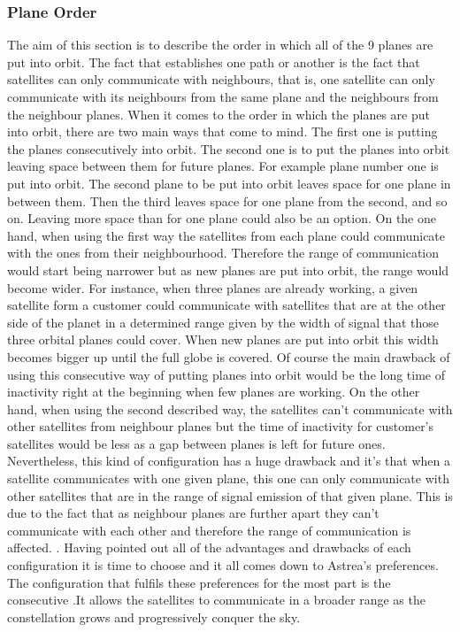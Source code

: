 \subsubsection{Plane Order}
The aim of this section is to describe the order in which all of the 9 planes are put into orbit. The fact that establishes one path or another is the fact that satellites can only communicate with neighbours, that is, one satellite can only communicate with its neighbours from the same plane and the neighbours from the neighbour planes.
\newline\newline
When it comes to the order in which the planes are put into orbit, there are two main ways that come to mind. The first one is putting the planes consecutively into orbit. The second one is to put the planes into orbit leaving space between them for future planes. For example plane number one is put into orbit. The second plane to be put into orbit leaves space for one plane in between them. Then the third leaves space for one plane from the second, and so on. Leaving more space than for one plane could also be an option.
\newline\newline
On the one hand, when using the first way the satellites from each plane could communicate with the ones from their neighbourhood. Therefore the range of communication would start being narrower but as new planes are put into orbit, the range would become wider. For instance, when three planes are already working, a given satellite form a customer could communicate with satellites that are at the other side of the planet in a determined range given by the width of signal that those three orbital planes could cover. When new planes are put into orbit this width becomes bigger up until the full globe is covered. Of course the main drawback of using this consecutive way of putting planes into orbit would be the long time of inactivity right at the beginning when few planes are working.
\newline\newline
On the other hand, when using the second described way, the satellites can't communicate with other satellites from neighbour planes but the time of inactivity for customer's satellites would be less as a gap between planes is left for future ones. Nevertheless, this kind of configuration has a huge drawback and it's that when a satellite communicates with one given plane, this one can only communicate with other satellites that are in the range of signal emission of that given plane. This is due to the fact that as neighbour planes are further apart they can't communicate with each other and therefore the range of communication is affected.
\newline\newline.
Having pointed out all of the advantages and drawbacks of each configuration it is time to choose and it all comes down to Astrea's preferences. The configuration that fulfils these preferences for the most part is the consecutive .It allows the satellites to communicate in a broader range as the constellation grows and progressively conquer the sky.





